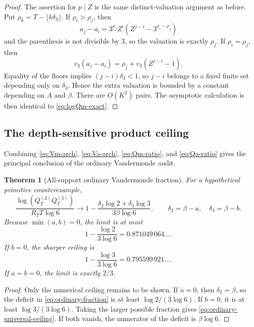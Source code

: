 \documentclass[11pt,oneside]{article}
\newtheorem{theorem}{Theorem}[section]
\theoremstyle{definition}
\theoremstyle{remark}
\begin{document}
\begin{proof}
The assertion for $p\mid Z$ is the same distinct-valuation argument as before.  Put
$\rho_k=T-\lfloor k\delta_3\rfloor$.  If $\rho_i>\rho_j$, then
\[
 a_j-a_i=3^{\rho_j}Z^i
 \left(Z^{j-i}-3^{\rho_i-\rho_j}\right)
\]
and the parenthesis is not divisible by $3$, so the valuation is exactly $\rho_j$.  If
$\rho_i=\rho_j$, then
\[
 v_3(a_j-a_i)=\rho_j+v_3(Z^{j-i}-1).
\]
Equality of the floors implies $(j-i)\delta_3<1$, so $j-i$ belongs to a fixed finite set
depending only on $\delta_3$.  Hence the extra valuation is bounded by a constant depending on
$A$ and $\beta$.  There are $O(K^2)$ pairs.  The asymptotic calculation is then identical to
\eqref{eq:logQm-exact}.
\end{proof}

\subsection{The depth-sensitive product ceiling}

Combining \eqref{eq:Vm-arch}, \eqref{eq:Va-arch},
\eqref{eq:Qm-ratio}, and \eqref{eq:Qa-ratio} gives the principal conclusion of the ordinary
Vandermonde audit.

\begin{theorem}[All-support ordinary Vandermonde fraction]\label{thm:ordinary-fraction}
For a hypothetical primitive counterexample,
\begin{equation}\label{eq:ordinary-fraction}
 \frac{\log(Q_T^{(2)}Q_T^{(3)})}{R_TT\log6}
 \longrightarrow
 1-\frac{\delta_2\log2+\delta_3\log3}{3\beta\log6},
 \qquad
 \delta_2=\beta-a,
 \quad
 \delta_3=\beta-b.
\end{equation}
Because $\min(a,b)=0$, the limit is at most
\begin{equation}\label{eq:ordinary-universal-ceiling}
 1-\frac{\log2}{3\log6}
 =0.871049\,064\ldots.
\end{equation}
If $b=0$, the sharper ceiling is
\[
 1-\frac{\log3}{3\log6}=0.795599\,921\ldots.
\]
If $a=b=0$, the limit is exactly $2/3$.
\end{theorem}

\begin{proof}
Only the numerical ceiling remains to be shown.  If $a=0$, then $\delta_2=\beta$, so the
deficit in \eqref{eq:ordinary-fraction} is at least $\log2/(3\log6)$.  If $b=0$, it is at
least $\log3/(3\log6)$.  Taking the larger possible fraction gives
\eqref{eq:ordinary-universal-ceiling}.  If both vanish, the numerator of the deficit is
$\beta\log6$.
\end{proof}
\end{document}
